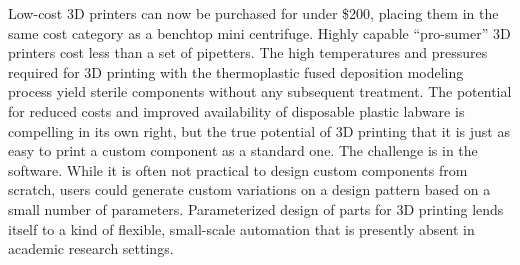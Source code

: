 \begin{refsection}
Low-cost 3D printers can now be purchased for under \$200, placing them in the same cost category as a benchtop mini centrifuge. Highly capable ``pro-sumer'' 3D printers cost less than a set of pipetters. The high temperatures and pressures required for 3D printing with the thermoplastic fused deposition modeling process yield sterile components without any subsequent treatment. The potential for reduced costs and improved availability of disposable plastic labware is compelling in its own right, but the true potential of 3D printing that it is just as easy to print a custom component as a standard one. The challenge is in the software. While it is often not practical to design custom components from scratch, users could generate custom variations on a design pattern based on a small number of parameters. Parameterized design of parts for 3D printing lends itself to a kind of flexible, small-scale automation that is presently absent in academic research settings.

\printbibliography[heading=subbibliography]

\end{refsection}
